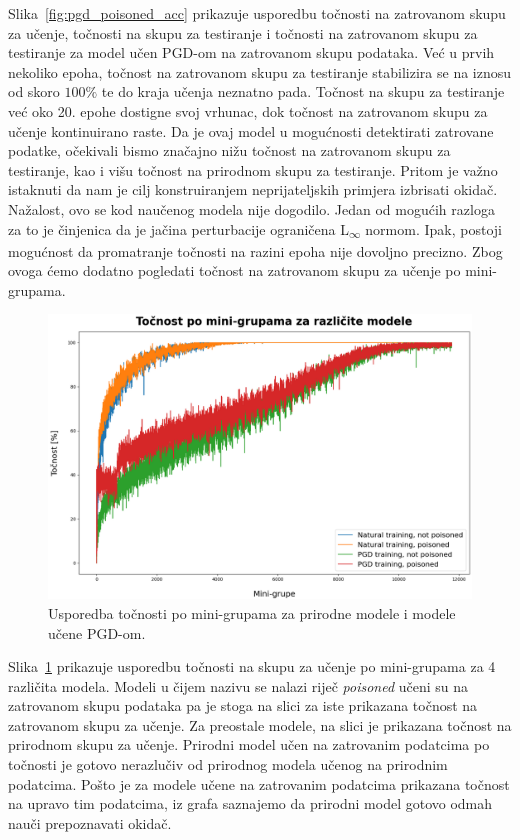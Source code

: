 \documentclass[times, utf8, zavrsni, numeric]{fer}
\begin{document}
\pagebreak

Slika~\ref{fig:pgd_poisoned_acc} prikazuje usporedbu točnosti na zatrovanom skupu za učenje, točnosti na skupu za testiranje i točnosti na zatrovanom skupu za testiranje 
za model učen PGD-om na zatrovanom skupu podataka. Već u prvih nekoliko epoha, točnost na zatrovanom skupu za testiranje stabilizira se na iznosu od skoro $100\%$ te do kraja učenja neznatno pada.
Točnost na skupu za testiranje već oko 20. epohe dostigne svoj vrhunac, dok točnost na zatrovanom skupu za učenje kontinuirano raste. Da je ovaj model u mogućnosti detektirati zatrovane podatke,
očekivali bismo značajno nižu točnost na zatrovanom skupu za testiranje, kao i višu točnost na prirodnom skupu za testiranje. 
Pritom je važno istaknuti da nam je cilj konstruiranjem neprijateljskih primjera izbrisati okidač. Nažalost, ovo se kod naučenog modela nije dogodilo.
Jedan od mogućih razloga za to je činjenica da je jačina perturbacije ograničena L\textsubscript{$\infty$} normom.
Ipak, postoji mogućnost da promatranje točnosti na razini epoha nije dovoljno precizno. Zbog ovoga ćemo dodatno pogledati točnost na zatrovanom skupu za učenje po mini-grupama.

\begin{figure}[htb]
    \centering
    \includegraphics[scale=0.4]{../stats/train_accuracy_comparison_nat_pgd.png}
    \caption{Usporedba točnosti po mini-grupama za prirodne modele i modele učene PGD-om.}
    \label{fig:pgd_nat_poisoned_comparison}
\end{figure}

\pagebreak

Slika~\ref{fig:pgd_nat_poisoned_comparison} prikazuje usporedbu točnosti na skupu za učenje po mini-grupama za 4 različita modela.
Modeli u čijem nazivu se nalazi riječ \textit{poisoned} učeni su na zatrovanom skupu podataka pa je stoga na slici za iste prikazana točnost na zatrovanom skupu za učenje.
Za preostale modele, na slici je prikazana točnost na prirodnom skupu za učenje.
Prirodni model učen na zatrovanim podatcima po točnosti je gotovo nerazlučiv od prirodnog modela učenog na prirodnim podatcima.
Pošto je za modele učene na zatrovanim podatcima prikazana točnost na upravo tim podatcima, iz grafa saznajemo da prirodni model gotovo odmah nauči prepoznavati okidač.
\end{document}
